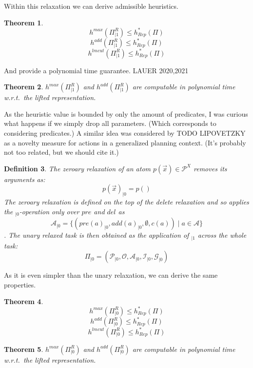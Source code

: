 \documentclass[twocolumn]{article}
\newcommand{\task}{\ensuremath{\Pi}\xspace}
\newcommand{\preds}{\ensuremath{\mathcal{P}}\xspace}
\newcommand{\acts}{\ensuremath{\mathcal{A}}\xspace}
\newcommand{\objects}{\ensuremath{\mathcal{O}}\xspace}
\newcommand{\init}{\ensuremath{\mathcal{I}}\xspace}
\newcommand{\goal}{\ensuremath{\mathcal{G}}\xspace}
\newcommand{\vars}{\ensuremath{X}\xspace}
\newcommand{\someVar}{\ensuremath{x}\xspace}
\newcommand{\atoms}{\ensuremath{\preds^{\vars}}\xspace}
\newcommand{\someAtom}{\ensuremath{p(\vec{\someVar})}\xspace}
\newcommand{\somePred}{\ensuremath{p}\xspace}
\newcommand{\prename}{\ensuremath{pre}\xspace}
\newcommand{\addname}{\ensuremath{add}\xspace}
\newcommand{\delname}{\ensuremath{del}\xspace}
\newcommand{\pre}[1]{\ensuremath{\prename(#1)}\xspace}
\newcommand{\add}[1]{\ensuremath{\addname(#1)}\xspace}
\newcommand{\cost}[1]{\ensuremath{c(#1)}\xspace}
\newcommand{\someAct}{\ensuremath{a}\xspace}
\newcommand{\optimalHeuristic}{\ensuremath{h^{*}_{Rep}}\xspace}
\newcommand{\unary}[1]{\ensuremath{#1_{|1}}\xspace}
\newcommand{\zeroary}[1]{\ensuremath{#1_{|0}}\xspace}
\newtheorem{theorem}{Theorem}
\newtheorem{definition}[theorem]{Definition}
\begin{document}
	Within this relaxation we can derive admissible heuristics.
	
	\begin{theorem}
		$$
			h^{max}(\unary{\task^{R}}) \leq \optimalHeuristic(\task)
		$$
		$$
		h^{add}(\unary{\task^{R}}) \leq \optimalHeuristic(\task)
		$$
		$$
		h^{lmcut}(\unary{\task^{R}}) \leq \optimalHeuristic(\task)
		$$
	\end{theorem}
	
	And provide a polynomial time guarantee. LAUER 2020,2021
	
	\begin{theorem}
		$
		h^{max}(\unary{\task^{R}})
		$
		and
		$
		h^{add}(\unary{\task^{R}})
		$
		are computable in polynomial time w.r.t.\ the lifted representation.
	\end{theorem}
	
	As the heuristic value is bounded by only the amount of predicates, I was curious what happens if we simply drop all parameters. 
	(Which corresponds to considering predicates.)
	A similar idea was considered by TODO LIPOVETZKY as a novelty measure for actions in a generalized planning context.
	(It's probably not too related, but we should cite it.)
	
	\begin{definition}
		The zeroary relaxation of an atom $\someAtom \in \atoms$ removes its arguments as:
		$$
		\zeroary{\someAtom} =  \somePred()
		$$
		The zeroary relaxation is defined on the top of the delete relaxation and so applies the {$\zeroary{}$}-operation only over \prename and \delname as
		$$
		\zeroary{\acts} = \{(\zeroary{\pre{\someAct}}, \zeroary{\add{\someAct}}, \emptyset, \cost{\someAct}) \mid \someAct \in \acts\}
		$$.
		The unary relaxed task is then obtained as the application of $\unary{}$ across the whole task:
		$$
		\zeroary{\task} = (\zeroary{\preds}, \objects, \zeroary{\acts}, \zeroary{\init}, \zeroary{\goal})
		$$
	\end{definition}
	
	As it is even simpler than the unary relaxation, we can derive the same properties.
	
	\begin{theorem}
		$$
		h^{max}(\zeroary{\task^{R}}) \leq \optimalHeuristic(\task)
		$$
		$$
		h^{add}(\zeroary{\task^{R}}) \leq \optimalHeuristic(\task)
		$$
		$$
		h^{lmcut}(\zeroary{\task^{R}}) \leq \optimalHeuristic(\task)
		$$
	\end{theorem}
	
	\begin{theorem}
		$
		h^{max}(\zeroary{\task^{R}})
		$
		and
		$
		h^{add}(\zeroary{\task^{R}})
		$
		are computable in polynomial time w.r.t.\ the lifted representation.
	\end{theorem}
	
\end{document}
